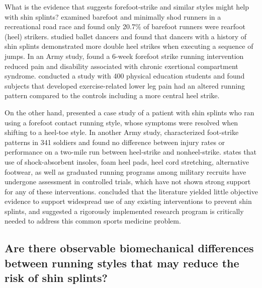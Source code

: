What is the evidence that suggests forefoot-strike and similar styles might help with shin splints? \citet{larson2014comparison} examined barefoot and minimally shod runners in a recreational road race and found only 20.7\% of barefoot runners were rearfoot (heel) strikers. \citet{gans1985relationship} studied ballet dancers and found that dancers with a history of shin splints demonstrated more double heel strikes when executing a sequence of jumps. In an Army study, \citet{diebal2012forefoot} found a 6-week forefoot strike running intervention reduced pain and disability associated with chronic exertional compartment syndrome. \citet{willems2004intrinsic} conducted a study with 400 physical education students and found subjects that developed exercise-related lower leg pain had an altered running pattern compared to the controls including a more central heel strike. 

On the other hand, \citet{cibulka1994shin} presented a case study of a patient with shin splints who ran using a forefoot contact running style, whose symptoms were resolved when shifting to a heel-toe style. In another Army study, \citet{warr2015characterization} characterized foot-strike patterns in 341 soldiers and found no difference between injury rates or performance on a two-mile run between heel-strike and nonheel-strike. \citet{thacker2002prevention} states that use of shock-absorbent insoles, foam heel pads, heel cord stretching, alternative footwear, as well as graduated running programs among military recruits have undergone assessment in controlled trials, which have not shown strong support for any of these interventions. \citet{thacker2002prevention} concluded that the literature yielded little objective evidence to support widespread use of any existing interventions to prevent shin splints, and suggested a rigorously implemented research program is critically needed to address this common sports medicine problem.




\subsection{Are there observable biomechanical differences between running styles that may reduce the risk of shin splints?}


